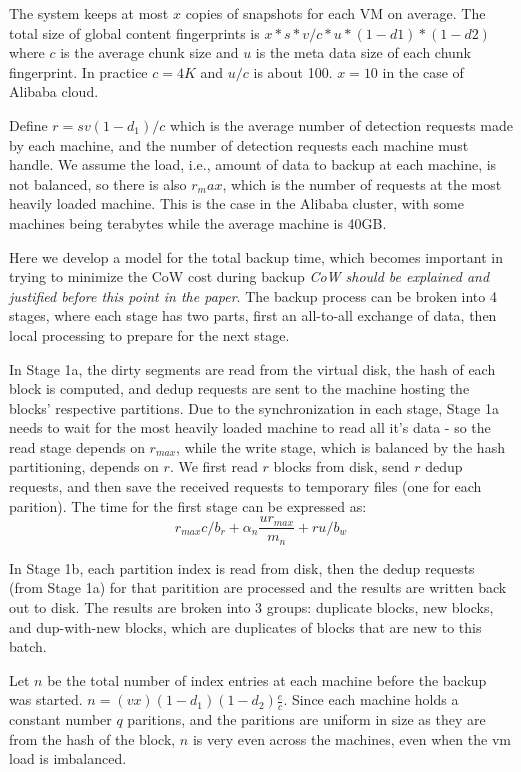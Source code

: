 The system keeps at most  $ x$ copies of snapshots for each VM on average.  The
total size of  global content fingerprints is $x*s*v/c*u *(1-d1)*(1-d2)$ where
$c$ is the average chunk size and $u$ is the meta data size of each chunk
fingerprint. In practice $c=4K$ and $u/c$  is about 100.  $x=10$ in the case of
Alibaba cloud.

Define $r = s v (1-d_1)/c$  which is the average number of detection
requests made by each machine, and the number of detection requests each
machine must handle.  We assume the load, i.e., amount of data to backup at
each machine, is not balanced, so there is also $r_max$, which is the number of
requests at the most heavily loaded machine. This is the case in the Alibaba
cluster, with some machines being terabytes while the average machine is 40GB.

Here we develop a model for the total backup time, which becomes important in
trying to minimize the CoW cost during backup \emph{CoW should be explained and
justified before this point in the paper}.  The backup process can be broken
into 4 stages, where each stage has two parts, first an all-to-all exchange of
data, then local processing to prepare for the next stage.

In Stage 1a, the dirty segments are read from the virtual disk, the hash of
each block is computed, and dedup requests are sent to the machine hosting the
blocks' respective partitions. Due to the synchronization in each stage, Stage
1a needs to wait for the most heavily loaded machine to read all it's data - so
the read stage depends on $r_{max}$, while the write stage, which is balanced
by the hash partitioning, depends on $r$. We first read $r$ blocks from disk,
send $r$ dedup requests, and then save the received requests to temporary files
(one for each parition). The time for the first stage can be expressed as:
\[
    r_{max} c / b_r + \alpha_n\frac{u r_{max}}{m_n} + r u / b_w
\]

In Stage 1b, each partition index is read from disk, then the dedup requests
(from Stage 1a) for that paritition are processed and the results are written
back out to disk. The results are broken into 3 groups: duplicate blocks, new
blocks, and dup-with-new blocks, which are duplicates of blocks that are new to
this batch.

Let $n$ be the total number of index entries at each machine before the backup
was started.  $n=(v x)(1-d_1)(1-d_2)\frac{e}{c}$. Since each machine holds a
constant number $q$ paritions, and the paritions are uniform in size as they
are from the hash of the block, $n$ is very even across the machines, even when
the vm load is imbalanced.

